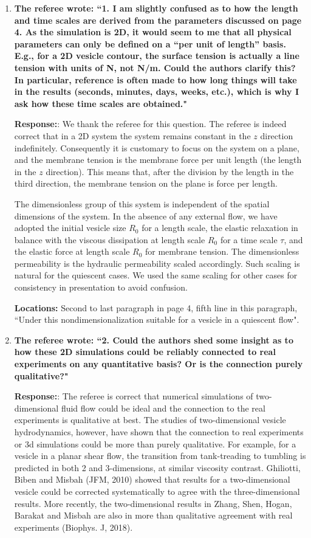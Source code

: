 \documentclass[12pt]{article}
\begin{document}
\begin{enumerate}

\item {\bf The referee wrote: ``1. I am slightly confused as to how the length and time scales are derived from the parameters discussed on page 4. As the simulation is 2D, it would seem to me that all physical parameters can only be defined on a “per unit of length” basis. E.g., for a 2D vesicle contour, the surface tension is actually a line tension with units of N, not N/m. Could the authors clarify this?
In particular, reference is often made to how long things will take in the results (seconds,
minutes, days, weeks, etc.), which is why I ask how these time scales are obtained."}

\noindent
{\bf Response:}: We thank the referee for this question. The referee is indeed correct that in a 2D system the system remains constant in the $z$ direction indefinitely. Consequently it is customary to focus on the system on a plane, and the membrane tension is the membrane force per unit length (the length in the $z$ direction). This means that, after the division by the length in the third direction, the membrane tension on the plane is force per length. 

The dimensionless group of this system is independent of the spatial dimensions of the system. In the absence of any external flow, we have adopted the initial vesicle size $R_0$ for a length scale,  the elastic relaxation in balance with the viscous dissipation at  length scale $R_0$ for a time scale $\tau$, and the elastic force at length scale $R_0$ for membrane tension. The dimensionless permeability is the hydraulic permeability scaled accordingly. Such scaling is natural for the quiescent cases. We used the same scaling for other cases for consistency in presentation to avoid confusion.

\noindent
{\bf Locations:} Second to last paragraph in page 4, fifth line in this paragraph, ``Under this nondimensionalization suitable for a vesicle in a quiescent flow".


\item {\bf The referee wrote: ``2. Could the authors shed some insight as to how these 2D simulations could be reliably connected to real experiments on any quantitative basis? Or is the connection purely
qualitative?"}

\noindent
{\bf Response:}: The referee is correct that numerical simulations of two-dimensional fluid flow could be ideal and the connection to the real experiments is qualitative at best. The studies of two-dimensional vesicle hydrodynamics, however, have shown that the connection to real experiments or 3d simulations could be more than purely qualitative. For example, for a vesicle in a planar shear flow, the transition from tank-treading to tumbling is predicted in both 2 and 3-dimensions, at similar viscosity contrast. Ghiliotti, Biben and Misbah (JFM, 2010) showed that results for a two-dimensional vesicle could be corrected systematically to agree with the three-dimensional results. More recently, the two-dimensional results in Zhang, Shen, Hogan, Barakat and Misbah are also in more than qualitative agreement with real experiments (Biophys. J, 2018). 


\end{enumerate}
\end{document}

